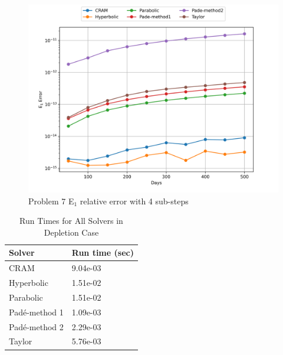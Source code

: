 \clearpage

\begin{figure}[p]
    \centering
    \includegraphics[width=6in]{images/chapter-5/progressionProblems/problem7/problem7E1ErrorerrorSteps4.png}
    \caption{Problem 7 E${}_{1}$ relative error with 4 sub-steps}
    \label{fig:problem7_E1_error_with_steps4}
\end{figure}

\clearpage

\begin{table}[p]
   \caption{\label{tab:problem7_run_times} Run Times for All Solvers in Depletion Case}
   \centering
   \begin{tabular}{ll}
   \hline
   Solver & Run time (sec)  \\
   \hline
   CRAM & 9.04e-03 \\
   Hyperbolic & 1.51e-02 \\
   Parabolic & 1.51e-02 \\
   Pad\'e-method 1 & 1.09e-03 \\
   Pad\'e-method 2 & 2.29e-03 \\
   Taylor & 5.76e-03 \\
   \hline
   \end{tabular}
\end{table}  

\clearpage

